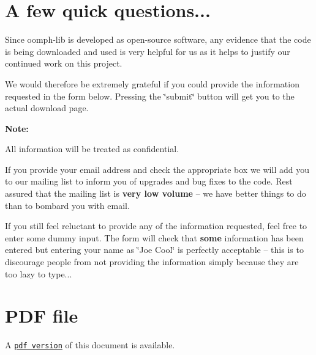 \hypertarget{index_q}{}\section{A few quick questions...}\label{index_q}
Since {\ttfamily oomph-\/lib} is developed as open-\/source software, any evidence that the code is being downloaded and used is very helpful for us as it helps to justify our continued work on this project.

We would therefore be extremely grateful if you could provide the information requested in the form below. Pressing the \char`\"{}submit\char`\"{} button will get you to the actual download page.

{\bfseries Note\+:} 
\begin{DoxyItemize}
\item All information will be treated as confidential. 
\item If you provide your email address and check the appropriate box we will add you to our mailing list to inform you of upgrades and bug fixes to the code. Rest assured that the mailing list is {\bfseries very low volume} -- we have better things to do than to bombard you with email. 
\item If you still feel reluctant to provide any of the information requested, feel free to enter some dummy input. The form will check that {\bfseries some} information has been entered but entering your name as \char`\"{}\+Joe Cool\char`\"{} is perfectly acceptable -- this is to discourage people from not providing the information simply because they are too lazy to type... 
\end{DoxyItemize}



 







 

 \hypertarget{index_pdf}{}\section{P\+D\+F file}\label{index_pdf}
A \href{../latex/refman.pdf}{\tt pdf version} of this document is available. 
